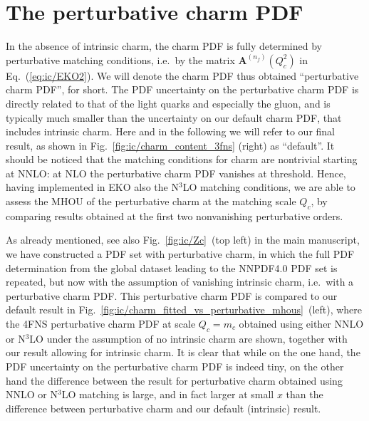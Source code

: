\section{The perturbative charm PDF}
\label{app:ic/consistency}

In the absence of intrinsic charm, the charm PDF is fully determined by
perturbative matching conditions, i.e.\ by the matrix
$\mathbf{A}^{(n_f)}(Q_{c}^2)$ in Eq.~(\ref{eq:ic/EKO2}).
%
We will denote the
charm PDF thus obtained
``perturbative charm PDF'', for short. The PDF
uncertainty on the perturbative charm PDF is directly related to that 
of the light quarks and especially the gluon, and is typically much smaller
than  the  uncertainty on our default charm PDF, that includes
intrinsic charm. Here and in the following we will refer to our final
result, as shown in Fig.~\ref{fig:ic/charm_content_3fns} (right) as ``default''.
%
It should be noticed that the matching conditions for charm are 
nontrivial starting
at NNLO: at NLO the perturbative charm PDF vanishes at threshold.
%
Hence, having implemented in EKO also the N$^3$LO matching conditions,
we are able to assess the MHOU of the perturbative charm at the
matching scale $Q_c$, by comparing
results obtained at the first two nonvanishing perturbative
orders.

As already mentioned, see also Fig.~\ref{fig:ic/Zc}~(top left) in the main manuscript, we have
constructed a PDF set with perturbative charm, in which the full PDF
determination from the global dataset leading to the NNPDF4.0 PDF set
is repeated, but now with the assumption of vanishing intrinsic charm,
i.e.\ with a perturbative charm PDF.
%
This perturbative charm PDF is compared to our default result
in Fig.~\ref{fig:ic/charm_fitted_vs_perturbative_mhous}~(left), where the 4FNS
perturbative 
charm PDF at scale  $Q_c=m_c$ obtained using either NNLO or N$^3$LO
under the assumption of no intrinsic charm are shown, together with
our  result allowing for intrinsic charm.
%
It is clear that while on the one hand, the PDF uncertainty on the
perturbative charm PDF is indeed tiny, on the other
hand the difference between the result for perturbative charm
obtained using NNLO or N$^3$LO matching is large, and in
fact larger at small $x$ than the difference between perturbative charm and our
default (intrinsic) result.

